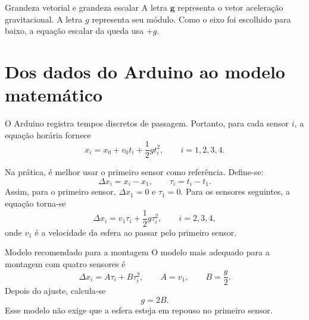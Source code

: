 \documentclass[11pt,a4paper]{article}
\newcommand{\vet}[1]{\bm{#1}}
\begin{document}
\begin{caixaCuidado}{Grandeza vetorial e grandeza escalar}
A letra $\vet g$ representa o vetor aceleração gravitacional. A letra $g$ representa seu módulo. Como o eixo foi escolhido para baixo, a equação escalar da queda usa $+g$.
\end{caixaCuidado}

\section{Dos dados do Arduino ao modelo matemático}

O Arduino registra tempos discretos de passagem. Portanto, para cada sensor $i$, a equação horária fornece
\begin{equation}
  x_i=x_0+v_0t_i+\frac{1}{2}gt_i^2,
  \qquad i=1,2,3,4.
  \label{eq:dados_absolutos}
\end{equation}

Na prática, é melhor usar o primeiro sensor como referência. Define-se:
\begin{equation}
  \Delta x_i=x_i-x_1,
  \qquad
  \tau_i=t_i-t_1.
  \label{eq:variaveis_relativas}
\end{equation}
Assim, para o primeiro sensor, $\Delta x_1=0$ e $\tau_1=0$. Para os sensores seguintes, a equação torna-se
\begin{equation}
  \Delta x_i=v_1\tau_i+\frac{1}{2}g\tau_i^2,
  \qquad i=2,3,4,
  \label{eq:modelo_relativo}
\end{equation}
onde $v_1$ é a velocidade da esfera ao passar pelo primeiro sensor.

\begin{caixaMetodo}{Modelo recomendado para a montagem}
O modelo mais adequado para a montagem com quatro sensores é
\[
\Delta x_i=A\tau_i+B\tau_i^2,
\qquad A=v_1,
\qquad B=\frac{g}{2}.
\]
Depois do ajuste, calcula-se
\[
\boxed{g=2B.}
\]
Esse modelo não exige que a esfera esteja em repouso no primeiro sensor.
\end{caixaMetodo}
\end{document}
